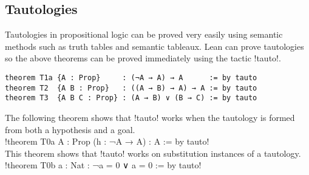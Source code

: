 \subsection{Tautologies}

Tautologies in propositional logic can be proved very easily using semantic methods such as truth tables and semantic tableaux. Lean can prove tautologies so the above theorems can be proved immediately using the tactic !tauto!.

\begin{Verbatim}[numbers=none]
theorem T1a {A : Prop}     : (¬A → A) → A      := by tauto
theorem T2  {A B : Prop}   : ((A → B) → A) → A := by tauto
theorem T3  {A B C : Prop} : (A → B) ∨ (B → C) := by tauto
\end{Verbatim}
The following theorem shows that !tauto! works when the tautology is formed from both a hypothesis and a goal.\\
\indnt{}!theorem T0a {A : Prop} (h : ¬A → A) : A := by tauto!\\

This theorem shows that !tauto! works on substitution instances of a tautology.\\
\indnt{}!theorem T0b {a : Nat} : ¬a = 0 ∨ a = 0 := by tauto!
